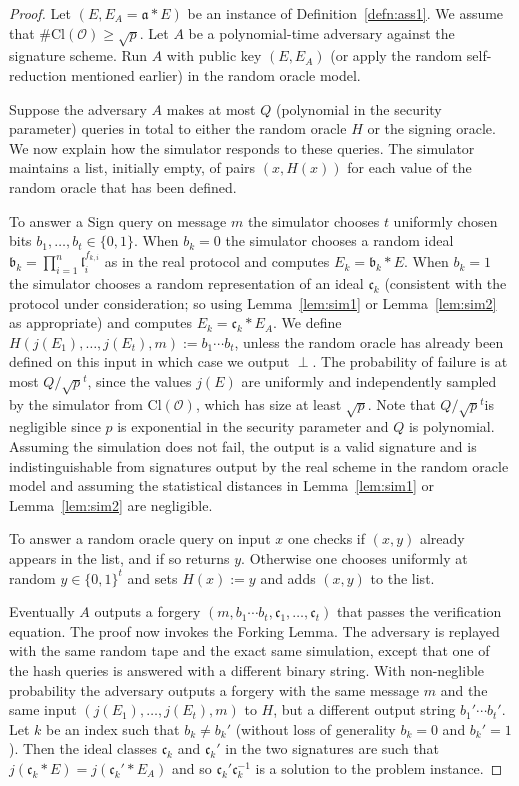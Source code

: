 \documentclass{llncs}
\newcommand{\OO}{\mathcal{O}}
\newcommand{\Cl}{\text{Cl}}
\renewcommand{\a}{\mathfrak{a}}
\renewcommand{\b}{\mathfrak{b}}
\renewcommand{\c}{\mathfrak{c}}
\renewcommand{\l}{\mathfrak{l}}
\begin{document}
\begin{proof}
Let $(E, E_A = \a * E )$ be an instance of Definition~\ref{defn:ass1}.
We assume that $\#\Cl(\OO) \ge \sqrt{p}$.
Let $A$ be a polynomial-time adversary against the signature scheme.
Run $A$ with public key $(E, E_A)$ (or apply the random self-reduction mentioned earlier) in the random oracle model.

Suppose the adversary $A$ makes at most $Q$ (polynomial in the security parameter) queries in total to either the random oracle $H$ or the signing oracle. We now explain how the simulator responds to these queries. The simulator maintains a list, initially empty, of pairs $(x, H(x))$ for each value of the random oracle that has been defined.

To answer a Sign query on message $m$ the simulator chooses 
$t$ uniformly chosen bits $b_1, \dots, b_t \in \{0,1\}$.
When $b_k = 0$ the simulator chooses a random ideal $\b_k = \prod_{i=1}^n \l_i^{f_{k,i}}$ as in the real protocol and computes $E_k = \b_k * E$.
When $b_k = 1$ the simulator chooses a random representation of an ideal $\c_k$ (consistent with the protocol under consideration; so using Lemma~\ref{lem:sim1} or Lemma~\ref{lem:sim2} as appropriate) and computes $E_k = \c_k * E_A$.
We define $H( j( E_1), \dots, j(E_t), m ) := b_1 \cdots b_t$, unless the random oracle has already been defined on this input in which case we output $\perp$.
The probability of failure is at most $Q/\sqrt{p}^t$, since the values $j(E)$ are uniformly and independently sampled by the simulator from $\Cl(\OO)$, which has size at least $\sqrt{p}$.
Note that $Q/\sqrt{p}^t$is negligible since $p$ is exponential in the security parameter and $Q$ is polynomial.
Assuming the simulation does not fail, the output is a valid signature and is indistinguishable from signatures output by the real scheme in the random oracle model and assuming the statistical distances in Lemma~\ref{lem:sim1} or Lemma~\ref{lem:sim2} are negligible.

To answer a random oracle query on input $x$ one checks if $(x,y)$ already appears in the list, and if so returns $y$. Otherwise one chooses uniformly at random $y \in \{0,1\}^t$ and sets $H(x) := y$ and adds $(x,y)$ to the list.

Eventually $A$ outputs a forgery $(m, b_1\cdots b_t, \c_1, \dots, \c_t)$ that passes the verification equation.
The proof now invokes the Forking Lemma. The adversary is replayed with the same random tape and the exact same simulation, except that one of the hash queries is answered with a different binary string.
With non-neglible probability the adversary outputs a forgery with the same message $m$ and the same input $(j(E_1), \dots, j(E_t), m)$ to $H$, but a different output string $b_1'\cdots b_t'$. Let $k$ be an index such that $b_k \ne b_k'$ (without loss of generality $b_k = 0$ and $b_k' = 1$). Then the ideal classes $\c_k$ and $\c_k'$ in the two signatures are such that $j( \c_k * E ) = j( \c_k' * E_A )$ and so $\c_k' \c_k^{-1}$ is a solution to the problem instance.
\end{proof}
\end{document}
